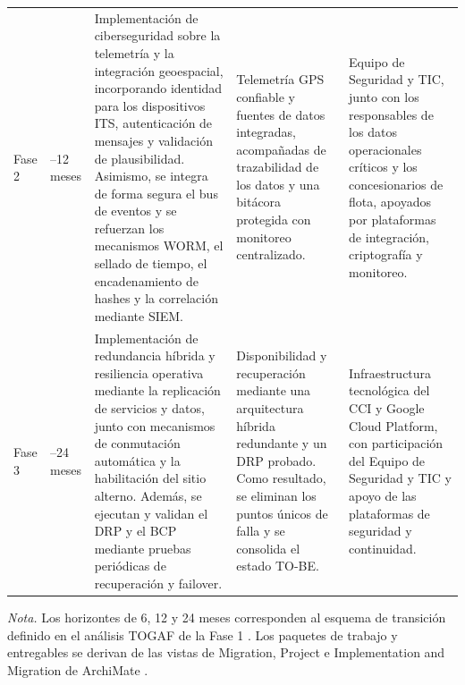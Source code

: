 \begin{table}[H]
\begin{tabularx}{\textwidth}{
			>{\raggedright\arraybackslash}p{1.6cm}
			>{\centering\arraybackslash}p{1.6cm}
			>{\raggedright\arraybackslash}X
			>{\raggedright\arraybackslash}X
			>{\raggedright\arraybackslash}p{2.7cm}}
		Fase 2                                                                                 &
		6--12 meses                                                                            &
		Implementación de ciberseguridad sobre la telemetría y la integración geoespacial,
		incorporando identidad para los dispositivos ITS, autenticación de mensajes y validación
		de plausibilidad. Asimismo, se integra de forma segura el bus de eventos y se refuerzan
		los mecanismos WORM, el sellado de tiempo, el encadenamiento de hashes y la
		correlación mediante SIEM.                                                             &
		Telemetría GPS confiable y fuentes de datos integradas, acompañadas de trazabilidad de
		los datos y una bitácora protegida con monitoreo centralizado.                       &
		Equipo de Seguridad y TIC, junto con los responsables de los datos operacionales
		críticos y los concesionarios de flota, apoyados por plataformas de integración,
		criptografía y monitoreo.                                                                \\

		\addlinespace

		Fase 3                                                                                 &
		12--24 meses                                                                           &
		Implementación de redundancia híbrida y resiliencia operativa mediante la replicación
		de servicios y datos, junto con mecanismos de conmutación automática y la habilitación
		del sitio alterno. Además, se ejecutan y validan el DRP y el BCP mediante pruebas
		periódicas de recuperación y failover.                                                 &
		Disponibilidad y recuperación mediante una arquitectura híbrida redundante y un DRP
		probado. Como resultado, se eliminan los puntos únicos de falla y se consolida el estado
		TO-BE.                                                                                 &
		Infraestructura tecnológica del CCI y Google Cloud Platform, con participación del
		Equipo de Seguridad y TIC y apoyo de las plataformas de seguridad y continuidad.         \\

		\bottomrule
	\end{tabularx}

	\begin{minipage}{0.96\textwidth}
		\footnotesize
		\textit{Nota.} Los horizontes de 6, 12 y 24 meses corresponden al esquema de transición
		definido en el análisis TOGAF de la Fase 1 \parencite{fase1cci2026}. Los paquetes de trabajo y entregables
		se derivan de las vistas de Migration, Project e Implementation and Migration
		de ArchiMate \parencite{archimate2022,modeloArchimateCCI2026}.
	\end{minipage}
\end{table}

